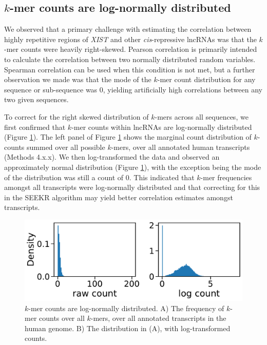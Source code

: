 \subsection{$k$-mer counts are log-normally distributed}

We observed that a primary challenge with estimating the correlation between highly repetitive regions of \emph{XIST} and other \emph{cis}-repressive lncRNAs was that the $k$-mer counts were heavily right-skewed. Pearson correlation is primarily intended to calculate the correlation between two normally distributed random variables. Spearman correlation can be used when this condition is not met, but a further observation we made was that the mode of the $k$-mer count distribution for any sequence or sub-sequence was 0, yielding artificially high correlations between any two given sequences. 

To correct for the right skewed distribution of $k$-mers across all sequences, we first confirmed that $k$-mer counts within lncRNAs are log-normally distributed (Figure \ref{fig:logdist}). The left panel of Figure \ref{fig:logdist} shows the marginal count distribution of $k$-counts summed over all possible $k$-mers, over all annotated human transcripts (Methods 4.x.x). We then log-transformed the data and observed an approximately normal distribution (Figure \ref{fig:logdist}), with the exception being the mode of the distribution was still a count of 0. This indicated that $k$-mer frequencies amongst all transcripts were log-normally distributed and that correcting for this in the SEEKR algorithm may yield better correlation estimates amongst transcripts. 
\begin{figure}[h!]
\centering
\includegraphics[width=\textwidth]{images/kmers_log_dist.pdf}
\caption{$k$-mer counts are log-normally distributed. A) The frequency of $k$-mer counts over all $k$-mers, over all annotated transcripts in the human genome. B) The distribution in (A), with log-transformed counts.}
\label{fig:logdist}
\end{figure}

